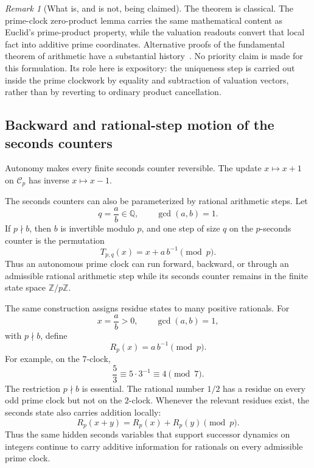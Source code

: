 \documentclass[11pt,a4paper]{article}
\theoremstyle{clockplain}
\theoremstyle{definition}
\theoremstyle{remark}
\newtheorem{remark}[proposition]{Remark}
\newcommand{\Q}{\mathbb Q}
\begin{document}
\begin{remark}[What is, and is not, being claimed]
The theorem is classical. The prime-clock zero-product lemma carries the same mathematical content as Euclid's prime-product property, while the valuation readouts convert that local fact into additive prime coordinates. Alternative proofs of the fundamental theorem of arithmetic have a substantial history~\cite{Dawson2015}. No priority claim is made for this formulation. Its role here is expository: the uniqueness step is carried out inside the prime clockwork by equality and subtraction of valuation vectors, rather than by reverting to ordinary product cancellation.
\end{remark}

\subsection{Backward and rational-step motion of the seconds counters}

Autonomy makes every finite seconds counter reversible. The update $x\mapsto x+1$ on $\mathcal C_p$ has inverse $x\mapsto x-1$.

The seconds counters can also be parameterized by rational arithmetic steps. Let
\[
q=\frac ab\in\Q,\qquad \gcd(a,b)=1.
\]
If $p\nmid b$, then $b$ is invertible modulo $p$, and one step of size $q$ on the $p$-seconds counter is the permutation
\begin{equation}
T_{p,q}(x)=x+a\,b^{-1}\pmod p.
\label{eq:rational-step}
\end{equation}
Thus an autonomous prime clock can run forward, backward, or through an admissible rational arithmetic step while its seconds counter remains in the finite state space $\mathbb Z/p\mathbb Z$.

The same construction assigns residue states to many positive rationals. For
\[
x=\frac ab>0,\qquad \gcd(a,b)=1,
\]
with $p\nmid b$, define
\begin{equation}
R_p(x)=a\,b^{-1}\pmod p.
\label{eq:rational-residue}
\end{equation}
For example, on the $7$-clock,
\[
\frac53\equiv5\cdot3^{-1}\equiv4\pmod7.
\]
The restriction $p\nmid b$ is essential. The rational number $1/2$ has a residue on every odd prime clock but not on the $2$-clock. Whenever the relevant residues exist, the seconds state also carries addition locally:
\[
R_p(x+y)=R_p(x)+R_p(y)\pmod p.
\]
Thus the same hidden seconds variables that support successor dynamics on integers continue to carry additive information for rationals on every admissible prime clock.
\end{document}
